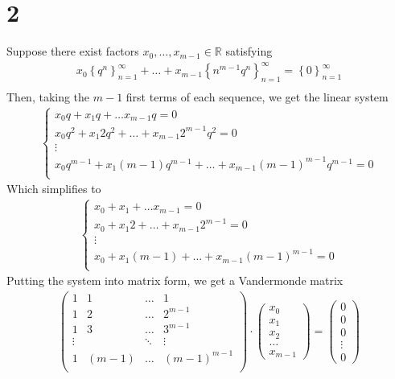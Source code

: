 \documentclass[11pt, a4paper]{article}
\begin{document}
\section*{2}
Suppose there exist factors $x_0,\ldots,x_{m-1} \in \mathbb{R}$ satisfying
\begin{align*}
x_0 \left\{ q^{n} \right\}_{n=1}^{ \infty }  + \ldots + x_{m-1} \left\{ n^{m-1} q^{n} \right\}_{n=1}^{ \infty } = \left\{ 0 \right\}_{n=1}^{ \infty } \\
\end{align*}
Then, taking the $m-1$ first terms of each sequence, we get the linear system
\begin{align*}
\begin{cases}
x_0 q + x_1 q + \ldots x_{m-1} q = 0\\
x_0 q^{2} + x_1 2 q^{2} + \ldots +x_{m-1} 2^{m-1} q^{2} = 0\\
\vdots\\
x_0 q^{m-1} + x_1 ( m-1) q^{m-1} + \ldots +x_{m-1} ( m-1) ^{m-1} q^{m-1} = 0\\
\end{cases}
\end{align*}
Which simplifies to
\begin{align*}
\begin{cases}
x_0  + x_1  + \ldots x_{m-1}  = 0\\
x_0  + x_1 2  + \ldots+ x_{m-1} 2^{m-1}  = 0\\
\vdots\\
x_0  + x_1 ( m-1) + \ldots +x_{m-1} ( m-1) ^{m-1}  = 0\\
\end{cases}
\end{align*}
Putting the system into matrix form, we get a Vandermonde matrix
\begin{align*}
\begin{pmatrix}
	1 & 1 & \ldots & 1 \\
	1 &2 & \ldots & 2^{m-1}\\
	1 &3 & \ldots & 3^{m-1}\\
	\vdots & & \ddots & \vdots \\
	1 & ( m-1)  & \ldots & ( m-1) ^{m-1}\\
\end{pmatrix}
\cdot 
\begin{pmatrix}
x_0 \\ x_1 \\ x_2 \\ \ldots \\ x_{m-1} 
\end{pmatrix}
= 
\begin{pmatrix}
0 \\ 0 \\ 0 \\ \vdots \\ 0
\end{pmatrix}
\end{align*}
\end{document}
